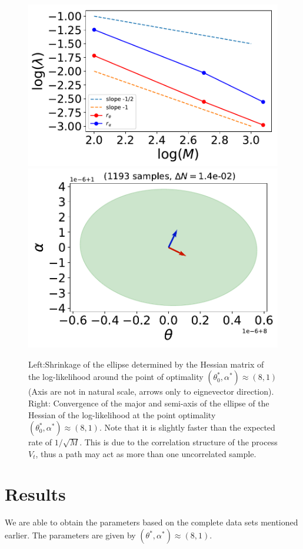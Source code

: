 \documentclass[ima, 20pt, portrait, plainboxedsections]{sciposter}
\begin{document}
\begin{multicols}{3}
\begin{figure}[t]
\begin{center}
    \includegraphics[width=0.6\linewidth]{ellipse_conv_samples_dN=14e-02.pdf}
   \includegraphics[width=0.6\linewidth]{ellipse1193_samples_dN=14e-02.pdf}
\end{center}
   \caption{Left:Shrinkage of the ellipse determined by the Hessian matrix of the log-likelihood around the point of optimality $(\theta_0^*, \alpha^*)\approx (8,1)$ (Axis are not in natural scale, arrows only to  eignevector direction). Right: Convergence of the major and semi-axis of the ellipse  of the Hessian of the log-likelihood at the point optimality $(\theta_0^*, \alpha^*)\approx (8,1)$. Note that it is slightly faster than the expected rate of $1/\sqrt{M}$. This is due to the correlation structure of the process $V_t$, thus a path may act  as more than one  uncorrelated sample.}
\label{ellipse_drawing}
\end{figure}






\section*{Results}
 We are able to obtain the parameters based on the complete data sets mentioned earlier. The parameters are given by $(\theta^*, \alpha^*)\approx (8,1)$.
 

\end{multicols}
\end{document}
